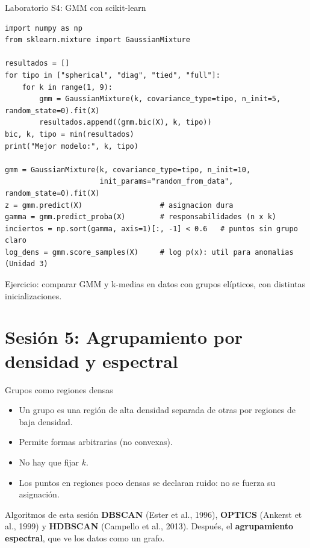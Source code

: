 \documentclass[aspectratio=169,11pt]{beamer}
\begin{document}
\begin{frame}[fragile]{Laboratorio S4: GMM con scikit-learn}
\begin{lstlisting}
import numpy as np
from sklearn.mixture import GaussianMixture

resultados = []
for tipo in ["spherical", "diag", "tied", "full"]:
    for k in range(1, 9):
        gmm = GaussianMixture(k, covariance_type=tipo, n_init=5, random_state=0).fit(X)
        resultados.append((gmm.bic(X), k, tipo))
bic, k, tipo = min(resultados)
print("Mejor modelo:", k, tipo)

gmm = GaussianMixture(k, covariance_type=tipo, n_init=10,
                      init_params="random_from_data", random_state=0).fit(X)
z = gmm.predict(X)                  # asignacion dura
gamma = gmm.predict_proba(X)        # responsabilidades (n x k)
inciertos = np.sort(gamma, axis=1)[:, -1] < 0.6   # puntos sin grupo claro
log_dens = gmm.score_samples(X)     # log p(x): util para anomalias (Unidad 3)
\end{lstlisting}
  {\small Ejercicio: comparar GMM y k-medias en datos con grupos elípticos, con distintas inicializaciones.}
\end{frame}

\section{Sesión 5: Agrupamiento por densidad y espectral}

\begin{frame}{Grupos como regiones densas}
  \begin{itemize}
    \item Un grupo es una región de \alert{alta densidad} separada de otras por regiones de baja densidad.
    \item Permite formas arbitrarias (no convexas).
    \item No hay que fijar $k$.
    \item Los puntos en regiones poco densas se declaran \alert{ruido}: no se fuerza su asignación.
  \end{itemize}
  \vspace{6pt}
  \begin{block}{Algoritmos de esta sesión}
    \textbf{DBSCAN} (Ester et al., 1996), \textbf{OPTICS} (Ankerst et al., 1999) y
    \textbf{HDBSCAN} (Campello et al., 2013). Después, el \textbf{agrupamiento espectral},
    que ve los datos como un grafo.
  \end{block}
\end{frame}
\end{document}
